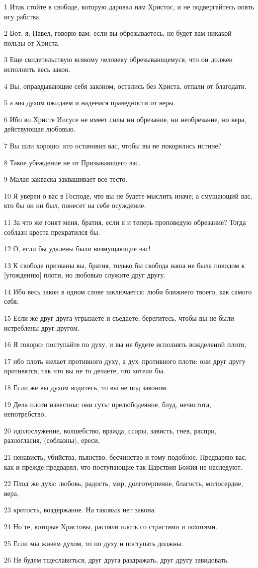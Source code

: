 \par 1 Итак стойте в свободе, которую даровал нам Христос, и не подвергайтесь опять игу рабства.
\par 2 Вот, я, Павел, говорю вам: если вы обрезываетесь, не будет вам никакой пользы от Христа.
\par 3 Еще свидетельствую всякому человеку обрезывающемуся, что он должен исполнить весь закон.
\par 4 Вы, оправдывающие себя законом, остались без Христа, отпали от благодати,
\par 5 а мы духом ожидаем и надеемся праведности от веры.
\par 6 Ибо во Христе Иисусе не имеет силы ни обрезание, ни необрезание, но вера, действующая любовью.
\par 7 Вы шли хорошо: кто остановил вас, чтобы вы не покорялись истине?
\par 8 Такое убеждение не от Призывающего вас.
\par 9 Малая закваска заквашивает все тесто.
\par 10 Я уверен о вас в Господе, что вы не будете мыслить иначе; а смущающий вас, кто бы он ни был, понесет на себе осуждение.
\par 11 За что же гонят меня, братия, если я и теперь проповедую обрезание? Тогда соблазн креста прекратился бы.
\par 12 О, если бы удалены были возмущающие вас!
\par 13 К свободе призваны вы, братия, только бы свобода ваша не была поводом к [угождению] плоти, но любовью служите друг другу.
\par 14 Ибо весь закон в одном слове заключается: люби ближнего твоего, как самого себя.
\par 15 Если же друг друга угрызаете и съедаете, берегитесь, чтобы вы не были истреблены друг другом.
\par 16 Я говорю: поступайте по духу, и вы не будете исполнять вожделений плоти,
\par 17 ибо плоть желает противного духу, а дух--противного плоти: они друг другу противятся, так что вы не то делаете, что хотели бы.
\par 18 Если же вы духом водитесь, то вы не под законом.
\par 19 Дела плоти известны; они суть: прелюбодеяние, блуд, нечистота, непотребство,
\par 20 идолослужение, волшебство, вражда, ссоры, зависть, гнев, распри, разногласия, (соблазны), ереси,
\par 21 ненависть, убийства, пьянство, бесчинство и тому подобное. Предваряю вас, как и прежде предварял, что поступающие так Царствия Божия не наследуют.
\par 22 Плод же духа: любовь, радость, мир, долготерпение, благость, милосердие, вера,
\par 23 кротость, воздержание. На таковых нет закона.
\par 24 Но те, которые Христовы, распяли плоть со страстями и похотями.
\par 25 Если мы живем духом, то по духу и поступать должны.
\par 26 Не будем тщеславиться, друг друга раздражать, друг другу завидовать.

